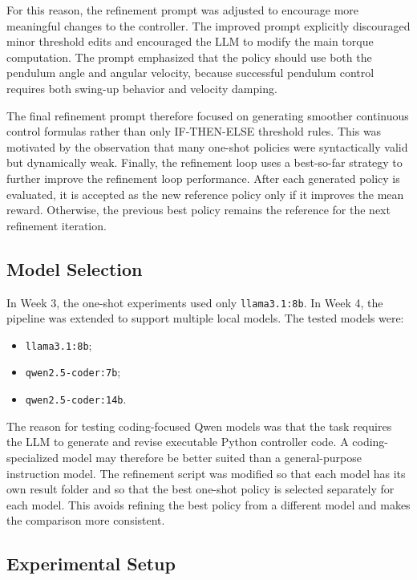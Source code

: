 \documentclass[11pt,a4paper]{article}
\begin{document}
For this reason, the refinement prompt was adjusted to encourage more meaningful changes to the controller. The improved prompt explicitly discouraged minor threshold edits and encouraged the LLM to modify the main torque computation. The prompt emphasized that the policy should use both the pendulum angle and angular velocity, because successful pendulum control requires both swing-up behavior and velocity damping.

The final refinement prompt therefore focused on generating smoother continuous control formulas rather than only IF-THEN-ELSE threshold rules. This was motivated by the observation that many one-shot policies were syntactically valid but dynamically weak. Finally, the refinement loop uses a best-so-far strategy to further improve the refinement loop performance. After each generated policy is evaluated, it is accepted as the new reference policy only if it improves the mean reward. Otherwise, the previous best policy remains the reference for the next refinement iteration.

\subsection{Model Selection}

In Week 3, the one-shot experiments used only \texttt{llama3.1:8b}. In Week 4, the pipeline was extended to support multiple local models. The tested models were:

\begin{itemize}
\item \texttt{llama3.1:8b};
\item \texttt{qwen2.5-coder:7b};
\item \texttt{qwen2.5-coder:14b}.
\end{itemize}

The reason for testing coding-focused Qwen models was that the task requires the LLM to generate and revise executable Python controller code. A coding-specialized model may therefore be better suited than a general-purpose instruction model. The refinement script was modified so that each model has its own result folder and so that the best one-shot policy is selected separately for each model. This avoids refining the best policy from a different model and makes the comparison more consistent.

\subsection{Experimental Setup}
\end{document}
